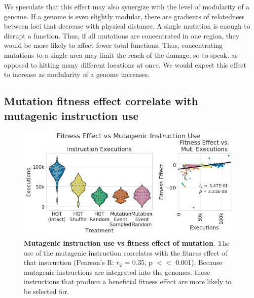 \documentclass[PhD]{msu-thesis}
\begin{document}
We speculate that this effect may also synergize with the level of modularity of a genome. If a genome is even slightly modular, there are gradients of relatedness between loci that decrease with physical distance. A single mutation is enough to disrupt a function. Thus, if all mutations are concentrated in one region, they would be more likely to affect fewer total functions. Thus, concentrating mutations to a single area may limit the reach of the damage, so to speak, as opposed to hitting many different locations at once. We would expect this effect to increase as modularity of a genome increases.





\subsection{Mutation fitness effect correlate with mutagenic instruction use}
	\begin{figure}[h!]
	\begin{center}
	\includegraphics[width=0.95\columnwidth]{figures/HGT/mutagen_use_vs_fitness_effect.png}
	\caption{\textbf{Mutagenic instruction use vs fitness effect of mutation}. The use of the mutagenic instruction correlates with the fitness effect of that instruction (Pearson’s R: $r_2$ = 0.35,
	p $<<$ 0.001). Because mutagenic instructions are integrated into the genomes, those instructions that produce a beneficial fitness effect are more likely to be selected for.
	}\label{fig:mutagen_use_vs_fitness_effect}
	\end{center}
	\end{figure}
\end{document}
